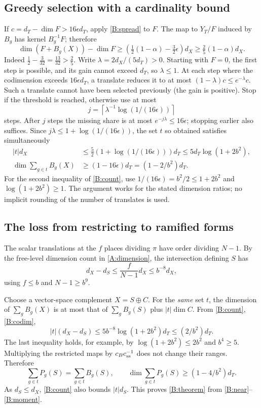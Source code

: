 \subsection{Greedy selection with a cardinality bound}
\label{B:greedy}
If \(c=d_T-\dim F>16\epsilon d_T\), apply \eqref{B:spread}
to \(F\). The map to \(Y_T/F\) induced by \(B_g\) has kernel
\(B_g^{-1}F\); therefore
\[
 \dim(F+B_g(X))-\dim F
 \ge (\tfrac12(1-\alpha)-\tfrac32\epsilon)d_X
 \ge \tfrac25(1-\alpha)d_X.
\]
Indeed \(\tfrac12-\tfrac3{32}=\tfrac{13}{32}>\tfrac25\).
Write \(\lambda=2d_X/(5d_T)>0\). Starting with \(F=0\), the first
step is possible, and its gain cannot exceed \(d_T\), so \(\lambda\le1\).
At each step where the codimension exceeds \(16\epsilon d_T\), a
translate reduces it to at most \((1-\lambda)c\le e^{-\lambda}c\).
Such a translate cannot have been selected previously (the gain is
positive). Stop if the threshold is reached, otherwise use at most
\[
 j=\left\lceil\lambda^{-1}\log(1/(16\epsilon))\right\rceil
\]
steps. After \(j\) steps the missing share is at most
\(e^{-j\lambda}\le16\epsilon\); stopping earlier also suffices.
Since \(j\lambda\le1+\log(1/(16\epsilon))\), the set \(t\)
so obtained satisfies simultaneously
\begin{align}
 |t|d_X&\le\tfrac52(1+\log(1/(16\epsilon)))d_T
 \le5d_T\log(1+2b^2),\label{B:count}\\
 \dim\sum_{g\in t} B_g(X)&\ge(1-16\epsilon)d_T
 =(1-2/b^2)d_T.\label{B:full}
\end{align}
For the second inequality of \eqref{B:count}, use
\(1/(16\epsilon)=b^2/2\le1+2b^2\) and
\(\log(1+2b^2)\ge1\). The argument works for the stated dimension
ratios; no implicit rounding of the number of translates is used.

\subsection{The loss from restricting to ramified forms}
\label{B:ramification}
The scalar translations at the \(f\) places dividing \(\pi\) have
order dividing \(N-1\). By the free-level dimension count
in \eqref{A:dimension}, the intersection defining \(S\) has
\begin{equation}
\label{B:codim}
 d_X-d_S\le \frac{f}{N-1}d_X\le b^{-8}d_X,
\end{equation}
using \(f\le b\) and \(N-1\ge b^9\).

Choose a vector-space complement \(X=S\oplus C\). For the
\emph{same} set \(t\), the dimension of
\(\sum_g B_g(X)\) is at most that of \(\sum_g B_g(S)\) plus
\(|t|\dim C\). From \eqref{B:count}, \eqref{B:codim},
\[
 |t|(d_X-d_S)\le 5 b^{-8}\log(1+2b^2)d_T
 \le (2/b^2)d_T .
\]
The last inequality holds, for example, by
\(\log(1+2b^2)\le 2b^2\) and \(b^4\ge5\).
Multiplying the restricted maps by \(c_Bc_{\rm ss}^{-1}\) does not
change their ranges. Therefore
\[
 \sum_{g\in t}P_g(S)=\sum_{g\in t}B_g(S),\qquad
 \dim\sum_{g\in t}P_g(S)\ge(1-4/b^2)d_T.
\]
As \(d_S\le d_X\), \eqref{B:count} also bounds \(|t|d_S\).
This proves \eqref{B:theorem} from \eqref{B:near}--\eqref{B:moment}.

